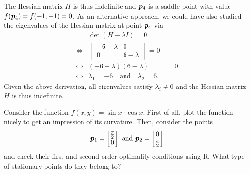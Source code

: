 \documentclass
[answers]
{exercise_sheet}
\begin{document}
\begin{Answer}{35}
\begin{enumerate}
The Hessian matrix $H$ is thus indefinite and $\bm{p}_4$ is a saddle point with value $f(\bm{p}_4) = f(-1, -1) = 0$. As an alternative approach, we could have also studied the eigenvalues of the Hessian matrix at point $\bm{p}_4$ via
\begin{align*}
& \det(H - \lambda I) = 0 \\
\Leftrightarrow & \begin{vmatrix}
-6-\lambda & 0 \\
0 & 6-\lambda 
\end{vmatrix} = 0 \\
\Leftrightarrow & (-6-\lambda)(6-\lambda) &= 0 \\
\Leftrightarrow & \lambda_1 = -6 \quad\text{and}\quad \lambda_2 = 6 .
\end{align*}
Given the above derivation, all eigenvalues satisfy $\lambda_i \neq 0 $ and the Hessian matrix $H$ is thus indefinite.
\end{enumerate}
\end{Answer}\fi\makeatother

\begin{Question}{9}
Consider the function $f(x,y) = \sin{x} \cdot \cos{x}$. First of all, plot the function nicely to get an impression of its curvature. Then, consider the points 
\begin{equation*}
\bm{p}_1 = \begin{bmatrix} \frac{\pi}{2} \\ 0 \end{bmatrix}
\text{ and }
\bm{p}_2 = \begin{bmatrix} 0 \\ \frac{\pi}{2} \end{bmatrix}
\end{equation*} 
and check their first and second order optimality conditions using R. What type of stationary points do they belong to?
\end{Question}
\end{document}
